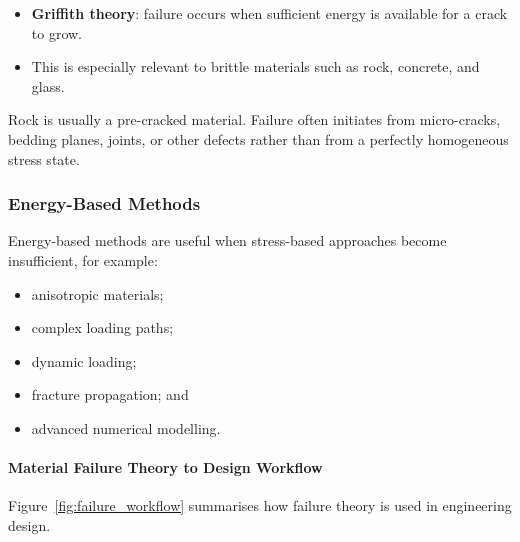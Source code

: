 \begin{itemize}
 \item \textbf{Griffith theory}: failure occurs when sufficient energy is available for
 a crack to grow.
 \item This is especially relevant to brittle materials such as rock, concrete, and glass.
\end{itemize}

\begin{warnbox}
Rock is usually a pre-cracked material. Failure often initiates from micro-cracks,
bedding planes, joints, or other defects rather than from a perfectly homogeneous stress
state.
\end{warnbox}

\subsubsection{Energy-Based Methods}

Energy-based methods are useful when stress-based approaches become insufficient, for
example:
\begin{itemize}
 \item anisotropic materials;
 \item complex loading paths;
 \item dynamic loading;
 \item fracture propagation; and
 \item advanced numerical modelling.
\end{itemize}

\paragraph{Material Failure Theory to Design Workflow}

Figure~\ref{fig:failure_workflow} summarises how failure theory is used in engineering
design.

